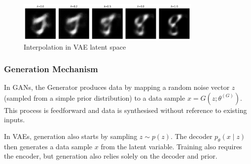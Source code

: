\vspace{-5pt}
\begin{figure}[h!]
    \centering
    \includegraphics[width=0.8\textwidth]{figures/vae-latent-space.png}
    \caption{Interpolation in VAE latent space}
    \label{fig:vae-latent-space}
\end{figure}
\vspace{-20pt}

\subsubsection{Generation Mechanism}

In GANs, the Generator produces data by mapping a random noise vector $z$ (sampled from a simple prior distribution)
to a data sample $x = G(z; \theta^{(G)})$.
This process is feedforward and data is synthesised without reference to existing inputs.

In VAEs, generation also starts by sampling $z \sim p(z)$.
The decoder $p_\theta(x \mid z)$ then generates a data sample $x$ from the latent variable.
Training also requires the encoder, but generation also relies solely on the decoder and prior.
